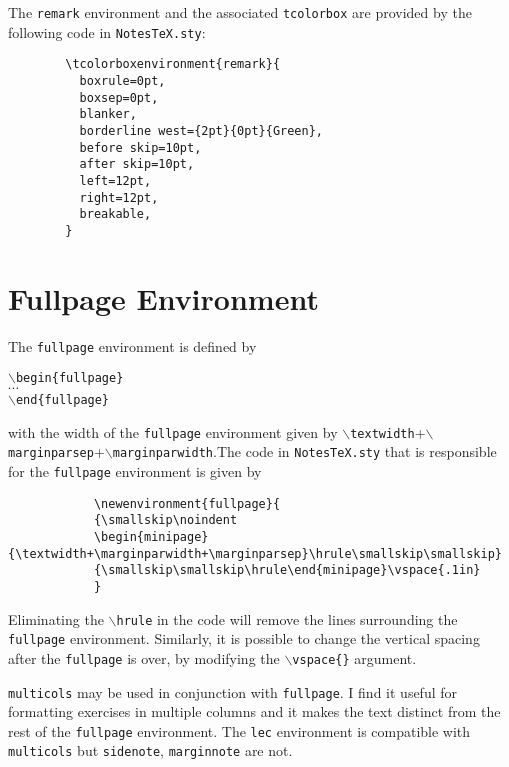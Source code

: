 \documentclass[10pt]{article}
\begin{document}
	\begin{remark}
		The \texttt{remark} environment and the associated \texttt{tcolorbox} are provided by the following code in \texttt{NotesTeX.sty}:
		\begin{verbatim}
		\tcolorboxenvironment{remark}{
		  boxrule=0pt,
		  boxsep=0pt,
		  blanker,
		  borderline west={2pt}{0pt}{Green},
		  before skip=10pt,
		  after skip=10pt,
		  left=12pt,
		  right=12pt,
		  breakable,
		}
		\end{verbatim}
	\end{remark}

	\section{Fullpage Environment}\label{Sec: Fullpage}
	\begin{fullpage}
		The \texttt{fullpage} environment is defined by
		\begin{center}
			\texttt{$\backslash$begin\{fullpage\}}\\
			$\cdots$\\
			\texttt{$\backslash$end\{fullpage\}}
		\end{center}
		with the width of the \texttt{fullpage} environment given by \texttt{$\backslash$textwidth}+\texttt{$\backslash$marginparsep}+\texttt{$\backslash$marginparwidth}.The code in \texttt{NotesTeX.sty} that is responsible for the \texttt{fullpage} environment is given by
		\begin{verbatim}
			\newenvironment{fullpage}{
			{\smallskip\noindent
			\begin{minipage}{\textwidth+\marginparwidth+\marginparsep}\hrule\smallskip\smallskip}
			{\smallskip\smallskip\hrule\end{minipage}\vspace{.1in}
			}
			\end{verbatim}
	\end{fullpage}
	\begin{remark}
		Eliminating the \texttt{$\backslash$hrule} in the code will remove the lines surrounding the \texttt{fullpage} environment. Similarly, it is possible to change the vertical spacing after the \texttt{fullpage} is over, by modifying the \texttt{$\backslash$vspace\{\}} argument. 
	\end{remark}
	
	\begin{fullpage}
		\begin{multicols}{2}
		\texttt{multicols}  may be used in conjunction with \texttt{fullpage}. I find it useful for formatting exercises in multiple columns and it makes the text distinct from the rest of the \texttt{fullpage} environment. The \texttt{lec} environment is compatible with \texttt{multicols} but \texttt{sidenote}, \texttt{marginnote} are not.\\

		\end{multicols}
	\end{fullpage}
\end{document}

